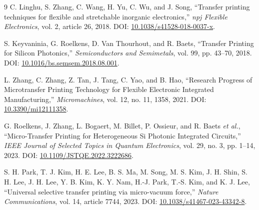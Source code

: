 \documentclass[11pt,a4paper]{article}
\begin{document}
\begin{thebibliography}{9}
C. Linghu, S. Zhang, C. Wang, H. Yu, C. Wu, and J. Song,
``Transfer printing techniques for flexible and stretchable inorganic electronics,''
\textit{npj Flexible Electronics}, vol. 2, article 26, 2018.
DOI: \href{https://doi.org/10.1038/s41528-018-0037-x}{10.1038/s41528-018-0037-x}.

S. Keyvaninia, G. Roelkens, D. Van Thourhout, and R. Baets,
``Transfer Printing for Silicon Photonics,''
\textit{Semiconductors and Semimetals}, vol. 99, pp. 43--70, 2018.
DOI: \href{https://doi.org/10.1016/bs.semsem.2018.08.001}{10.1016/bs.semsem.2018.08.001}.

L. Zhang, C. Zhang, Z. Tan, J. Tang, C. Yao, and B. Hao,
``Research Progress of Microtransfer Printing Technology for Flexible Electronic Integrated Manufacturing,''
\textit{Micromachines}, vol. 12, no. 11, 1358, 2021.
DOI: \href{https://doi.org/10.3390/mi12111358}{10.3390/mi12111358}.

G. Roelkens, J. Zhang, L. Bogaert, M. Billet, P. Ossieur, and R. Baets \textit{et al.},
``Micro-Transfer Printing for Heterogeneous Si Photonic Integrated Circuits,''
\textit{IEEE Journal of Selected Topics in Quantum Electronics}, vol. 29, no. 3, pp. 1--14, 2023.
DOI: \href{https://doi.org/10.1109/JSTQE.2022.3222686}{10.1109/JSTQE.2022.3222686}.

S. H. Park, T. J. Kim, H. E. Lee, B. S. Ma, M. Song, M. S. Kim, J. H. Shin, S. H. Lee, J. H. Lee, Y. B. Kim, K. Y. Nam, H.-J. Park, T.-S. Kim, and K. J. Lee,
``Universal selective transfer printing via micro-vacuum force,''
\textit{Nature Communications}, vol. 14, article 7744, 2023.
DOI: \href{https://doi.org/10.1038/s41467-023-43342-8}{10.1038/s41467-023-43342-8}.

\end{thebibliography}
\end{document}

